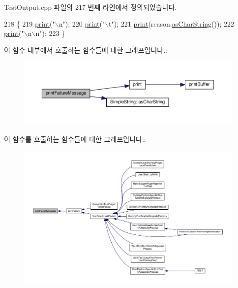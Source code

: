 Test\+Output.\+cpp 파일의 217 번째 라인에서 정의되었습니다.


\begin{DoxyCode}
218 \{
219     \hyperlink{class_test_output_a321b5c489a90374cb61c34fe5d2253ef}{print}(\textcolor{stringliteral}{"\(\backslash\)n"});
220     \hyperlink{class_test_output_a321b5c489a90374cb61c34fe5d2253ef}{print}(\textcolor{stringliteral}{"\(\backslash\)t"});
221     \hyperlink{class_test_output_a321b5c489a90374cb61c34fe5d2253ef}{print}(reason.\hyperlink{class_simple_string_af7c0efaf31f42553f05719903c830be1}{asCharString}());
222     \hyperlink{class_test_output_a321b5c489a90374cb61c34fe5d2253ef}{print}(\textcolor{stringliteral}{"\(\backslash\)n\(\backslash\)n"});
223 \}
\end{DoxyCode}


이 함수 내부에서 호출하는 함수들에 대한 그래프입니다.\+:
\nopagebreak
\begin{figure}[H]
\begin{center}
\leavevmode
\includegraphics[width=350pt]{class_test_output_ab13cdfa930cc1ad29b36b1ab7ff77a99_cgraph}
\end{center}
\end{figure}




이 함수를 호출하는 함수들에 대한 그래프입니다.\+:
\nopagebreak
\begin{figure}[H]
\begin{center}
\leavevmode
\includegraphics[width=350pt]{class_test_output_ab13cdfa930cc1ad29b36b1ab7ff77a99_icgraph}
\end{center}
\end{figure}


